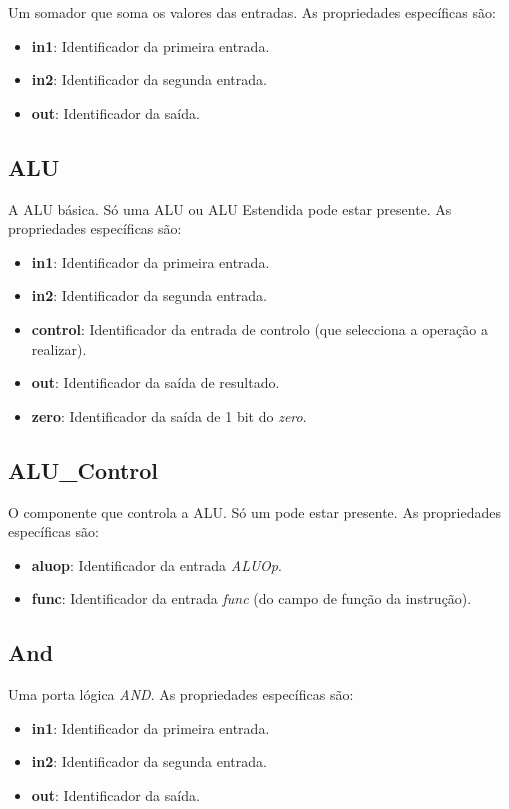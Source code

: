 \documentclass[11pt,a4paper,twoside,titlepage]{report}
\begin{document}
Um somador que soma os valores das entradas. As propriedades específicas são:
\begin{itemize}
	\item \textbf{in1}: Identificador da primeira entrada.
	\item \textbf{in2}: Identificador da segunda entrada.
	\item \textbf{out}: Identificador da saída.
\end{itemize}

\subsection{ALU}

A ALU básica. Só uma ALU ou ALU Estendida pode estar presente. As propriedades
específicas são:
\begin{itemize}
	\item \textbf{in1}: Identificador da primeira entrada.
	\item \textbf{in2}: Identificador da segunda entrada.
	\item \textbf{control}: Identificador da entrada de controlo (que selecciona
		a operação a realizar).
	\item \textbf{out}: Identificador da saída de resultado.
	\item \textbf{zero}: Identificador da saída de 1 bit do \emph{zero}.
\end{itemize}

\subsection{ALU\_Control}

O componente que controla a ALU. Só um pode estar presente.
As propriedades específicas são:
\begin{itemize}
	\item \textbf{aluop}: Identificador da entrada \emph{ALUOp}.
	\item \textbf{func}: Identificador da entrada \emph{func} (do campo de função
		da instrução).
\end{itemize}

\subsection{And}

Uma porta lógica \emph{AND}. As propriedades específicas são:
\begin{itemize}
	\item \textbf{in1}: Identificador da primeira entrada.
	\item \textbf{in2}: Identificador da segunda entrada.
	\item \textbf{out}: Identificador da saída.
\end{itemize}
\end{document}
